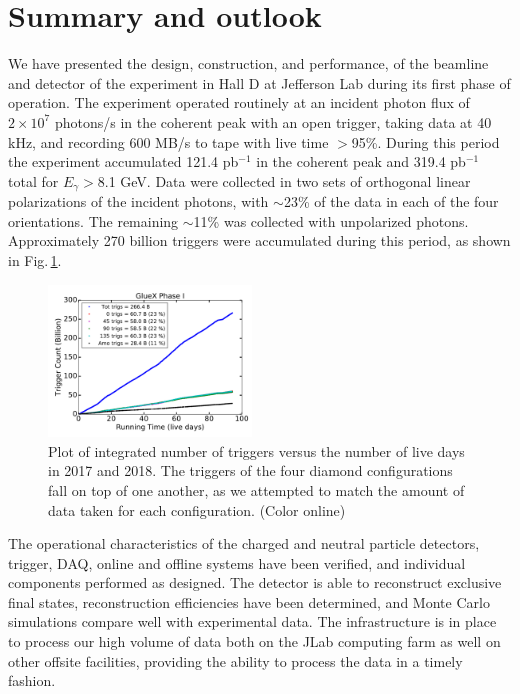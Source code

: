 
\section{Summary and outlook\label{sec:summary} }
We have presented the design, construction, and performance, of the beamline and detector of the \gx{} experiment in Hall D at Jefferson Lab during its first phase of operation. The experiment operated routinely at an incident photon flux of $2\times 10^{7}$ photons/s in the coherent peak with an open trigger, taking data at 40 kHz, and recording 600 MB/s to tape with live time $>$95\%. During this period the experiment accumulated  121.4 pb$^{-1}$ in the coherent peak and 319.4 pb$^{-1}$ total for $E_\gamma>$8.1 GeV. Data were collected in two sets of orthogonal linear polarizations of the incident photons, with $\sim$23\% of the data in each of the four orientations. The remaining $\sim$11\% was collected with unpolarized photons. Approximately 270 billion triggers were accumulated during this period, as shown in Fig.\,\ref{fig:plot_rcdb3_phaseI}.  

\begin{figure}[tbh]\centering
\includegraphics[width=0.48\textwidth]{figures/plot_rcdb3_phaseI.pdf}
\caption{\label{fig:plot_rcdb3_phaseI} 
Plot of integrated number of triggers versus the number of live days in 2017 and 2018. The triggers of the four diamond configurations fall on top of one another, as we attempted to match the amount of data taken for each configuration. 
(Color online)    
 }   
\end{figure}     

The operational characteristics of the charged and neutral particle detectors, trigger, DAQ, online and offline systems have been verified, and individual components performed as designed. The detector is able to reconstruct exclusive final states, reconstruction efficiencies have been determined, and Monte Carlo simulations compare well with experimental data. The infrastructure is in place to process our high volume of data both on the JLab computing farm as well on other offsite facilities, providing the ability to process the data in a timely fashion.

